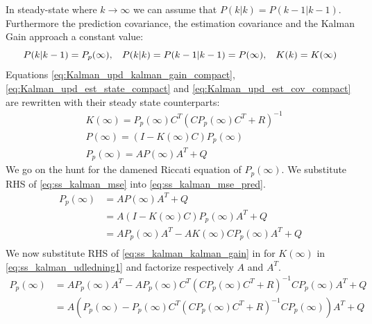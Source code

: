 In steady-state where $k \rightarrow \infty$ we can assume that ${P}(k|k) = {P}(k-1|k-1) $. Furthermore the prediction covariance, the estimation covariance and the Kalman Gain approach a constant value:
\begin{equation}
	{P}(k|k-1) =  {P}_p(\infty), \hspace{3mm} {P}(k|k) = {P}(k-1|k-1) = {P}(\infty),  \hspace{3mm} {K}(k) = {K}(\infty)
\end{equation}
Equations \cref{eq:Kalman_upd_kalman_gain_compact}, \cref{eq:Kalman_upd_est_state_compact} and \cref{eq:Kalman_upd_est_cov_compact} are rewritten with their steady state counterparts:
\begin{align}
	& {K}(\infty) = {P}_p(\infty) {C}^T ({C} {P}_p	(\infty) {C}^T + {R})^{-1} \label{eq:ss_kalman_kalman_gain} \\
	& {P}(\infty) = ({I} - {K}(\infty) {C}) {P}_p(\infty) \label{eq:ss_kalman_mse} \\
	& {P}_p(\infty) = {A}{P}(\infty){A}^T + {Q} \label{eq:ss_kalman_mse_pred}
\end{align}
We go on the hunt for the damened Riccati equation of ${P}_p(\infty)$. We substitute RHS of \cref{eq:ss_kalman_mse} into \cref{eq:ss_kalman_mse_pred}.
\begin{equation}
	\begin{split}\label{eq:ss_kalman_udledning1}
		{P}_p(\infty) 	& = {A}{P}(\infty)A^T + Q \\
		& = {A} ({I}-{K}(\infty){C}) {P}_p(\infty) {A}^T + {Q}\\
		& = {A} {P}_p(\infty) {A}^T - {A} {K}(\infty) {C} {P}_p(\infty)  {A}^T + {Q}\\
		\end{split}
\end{equation}
We now substitute RHS of \cref{eq:ss_kalman_kalman_gain} in for ${K}(\infty)$ in \cref{eq:ss_kalman_udledning1} and factorize respectively ${A}$ and $ {A}^T $.
\begin{equation}
	\begin{split}\label{eq:ss_kalman_udledning2}
		{P}_p(\infty) & = {A} {P}_p(\infty) {A}^T - {A} {P}_p(\infty) {C}^T ({C} {P}_p(\infty) {C}^T + {R})^{-1} {C} {P}_p(\infty) {A}^T + {Q}\\
		& = {A} ({P}_p(\infty) - {P}_p(\infty) {C}^T ({C} {P}_p(\infty) {C}^T + {R})^{-1} {C} {P}_p(\infty)) {A}^T + {Q}\\
	\end{split}
\end{equation}
